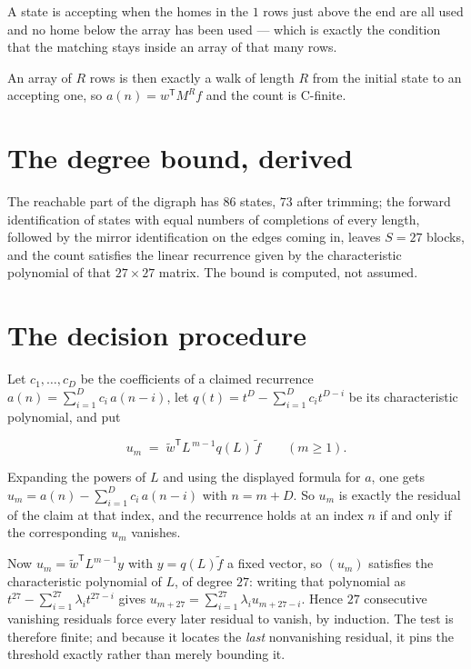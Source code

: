 \documentclass[11pt]{article}
\theoremstyle{definition}
\begin{document}
A state is accepting when the homes in the $1$ rows just above the end are all used and no home below the array has been used --- which is exactly the condition that the matching stays inside an array of that many rows.

An array of $R$ rows is then exactly a walk of length $R$ from the initial state to an accepting one, so $a(n) = w^{\mathsf T}M^{R}f$ and the count is C-finite.

\section{The degree bound, derived}

The reachable part of the digraph has $86$ states, $73$ after trimming; the forward identification of states with equal numbers of completions of every length, followed by the mirror identification on the edges coming in, leaves $S = 27$ blocks, and the count satisfies the linear recurrence given by the characteristic polynomial of that $27\times27$ matrix. The bound is computed, not assumed.

\section{The decision procedure}

Let $c_1,\dots,c_D$ be the coefficients of a claimed recurrence $a(n) = \sum_{i=1}^{D} c_i\,a(n-i)$, let $q(t) = t^{D} - \sum_{i=1}^{D} c_i t^{D-i}$ be its characteristic polynomial, and put

\[u_m \;=\; \tilde w^{\mathsf T} L^{\,m-1} q(L)\,\tilde f \qquad (m \ge 1).\]

Expanding the powers of $L$ and using the displayed formula for $a$, one gets $u_m = a(n) - \sum_{i=1}^{D} c_i\,a(n-i)$ with $n = m + D$. So $u_m$ is exactly the residual of the claim at that index, and the recurrence holds at an index $n$ if and only if the corresponding $u_m$ vanishes.

Now $u_m = \tilde w^{\mathsf T} L^{m-1} y$ with $y = q(L)\tilde f$ a fixed vector, so $(u_m)$ satisfies the characteristic polynomial of $L$, of degree $27$: writing that polynomial as $t^{27} - \sum_{i=1}^{27} \lambda_i t^{27-i}$ gives $u_{m+27} = \sum_{i=1}^{27} \lambda_i u_{m+27-i}$. Hence $27$ consecutive vanishing residuals force every later residual to vanish, by induction. The test is therefore finite; and because it locates the {\itshape last} nonvanishing residual, it pins the threshold exactly rather than merely bounding it.
\end{document}
